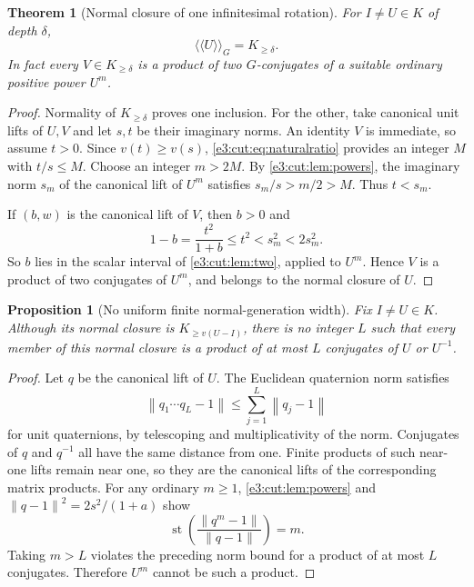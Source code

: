 \documentclass[11pt,letterpaper]{article}
\numberwithin{equation}{section}
\newtheorem{theorem}{Theorem}[section]
\newtheorem{proposition}[proposition]{Proposition}
\theoremstyle{definition}
\theoremstyle{remark}
\newcommand{\st}{\operatorname{st}}
\newcommand{\norm}[1]{\left\lVert#1\right\rVert}
\newcommand{\nc}[1]{\langle\!\langle #1\rangle\!\rangle}
\begin{document}
\begin{theorem}[Normal closure of one infinitesimal rotation]\label{e3:cut:thm:normalclosure}
For $I\ne U\in K$ of depth $\delta$,
\begin{equation}\label{e3:cut:eq:normalclosure}
 \nc U_G=K_{\ge\delta}.
\end{equation}
In fact every $V\in K_{\ge\delta}$ is a product of two $G$-conjugates of a
suitable ordinary positive power $U^m$.
\end{theorem}
\begin{proof}
Normality of $K_{\ge\delta}$ proves one inclusion. For the other, take canonical
unit lifts of $U,V$ and let $s,t$ be their imaginary norms. An identity $V$ is
immediate, so assume $t>0$. Since $v(t)\ge v(s)$, \cref{e3:cut:eq:naturalratio}
provides an integer $M$ with $t/s\le M$. Choose an integer $m>2M$. By
\cref{e3:cut:lem:powers}, the imaginary norm $s_m$ of the canonical lift of
$U^m$ satisfies $s_m/s>m/2>M$. Thus $t<s_m$.

If $(b,w)$ is the canonical lift of $V$, then $b>0$ and
\[
 1-b=\frac{t^2}{1+b}\le t^2<s_m^2<2s_m^2.
\]
So $b$ lies in the scalar interval of \cref{e3:cut:lem:two}, applied to $U^m$.
Hence $V$ is a product of two conjugates of $U^m$, and belongs to the normal
closure of $U$.
\end{proof}

\begin{proposition}[No uniform finite normal-generation width]\label{e3:cut:prop:width}
Fix $I\ne U\in K$. Although its normal closure is $K_{\ge v(U-I)}$, there is
no integer $L$ such that every member of this normal closure is a product of
at most $L$ conjugates of $U$ or $U^{-1}$.
\end{proposition}
\begin{proof}
Let $q$ be the canonical lift of $U$. The Euclidean quaternion norm satisfies
\[
 \norm{q_1\cdots q_L-1}\le\sum_{j=1}^L\norm{q_j-1}
\]
for unit quaternions, by telescoping and multiplicativity of the norm.
Conjugates of $q$ and $q^{-1}$ all have the same distance from one. Finite
products of such near-one lifts remain near one, so they are the canonical lifts
of the corresponding matrix products. For any ordinary $m\ge1$,
\cref{e3:cut:lem:powers} and $\norm{q-1}^2=2s^2/(1+a)$ show
\[
 \st\!\left(\frac{\norm{q^m-1}}{\norm{q-1}}\right)=m.
\]
Taking $m>L$ violates the preceding norm bound for a product of at most $L$
conjugates. Therefore $U^m$ cannot be such a product.
\end{proof}
\end{document}

